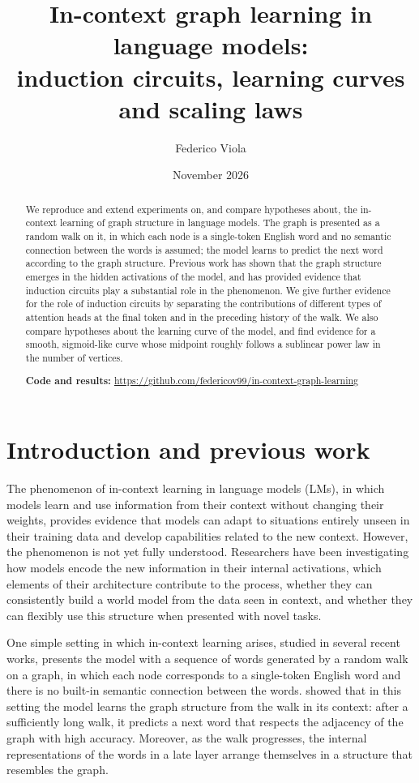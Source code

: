 \documentclass[11pt,a4paper]{article}
\title{In-context graph learning in language models:\\
induction circuits, learning curves and scaling laws}
\author{Federico Viola}
\date{November 2026}
\begin{document}
\maketitle

\begin{abstract}
We reproduce and extend experiments on, and compare hypotheses about, the in-context learning of graph structure in
language models. The graph is presented as a random walk on it, in which each node is a single-token English word and
no semantic connection between the words is assumed; the model learns to predict the next word according to the graph
structure. Previous work has shown that the graph structure emerges in the hidden activations of the model, and has
provided evidence that induction circuits play a substantial role in the phenomenon. We give further evidence for the
role of induction circuits by separating the contributions of different types of attention heads at the final token
and in the preceding history of the walk. We also compare hypotheses about the learning curve of the model, and find
evidence for a smooth, sigmoid-like curve whose midpoint roughly follows a sublinear power law in the number of
vertices.

\medskip
\noindent\textbf{Code and results:} \url{https://github.com/federicov99/in-context-graph-learning}
\end{abstract}

\section{Introduction and previous work}

The phenomenon of in-context learning in language models (LMs), in which models learn and use information from their
context without changing their weights, provides evidence that models can adapt to situations entirely unseen in their
training data and develop capabilities related to the new context. However, the phenomenon is not yet fully
understood. Researchers have been investigating how models encode the new information in their internal activations,
which elements of their architecture contribute to the process, whether they can consistently build a world model from
the data seen in context, and whether they can flexibly use this structure when presented with novel tasks.

One simple setting in which in-context learning arises, studied in several recent works, presents the model with a
sequence of words generated by a random walk on a graph, in which each node corresponds to a single-token English word
and there is no built-in semantic connection between the words. \citet{park2025} showed that in this setting the model
learns the graph structure from the walk in its context: after a sufficiently long walk, it predicts a next word that
respects the adjacency of the graph with high accuracy. Moreover, as the walk progresses, the internal representations
of the words in a late layer arrange themselves in a structure that resembles the graph.
\end{document}
